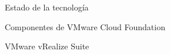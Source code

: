 \begin{section}{Estado de la tecnología}
\begin{subsection}{Componentes de VMware Cloud Foundation \cite{componentesCloudFound}}
\begin{subsubsection}{VMware vRealize Suite}
\end{subsubsection}

\end{subsection}
\end{section}
